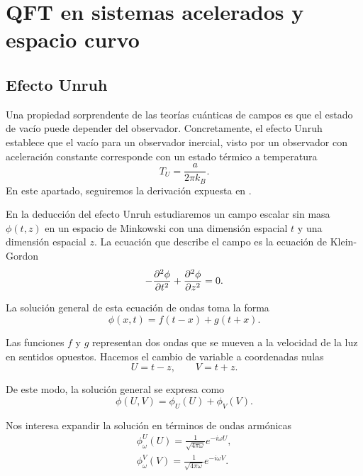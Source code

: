 \chapter{QFT en sistemas acelerados y espacio curvo}

\section{Efecto Unruh}

Una propiedad sorprendente de las teorías cuánticas de campos es que el estado de vacío
puede depender del observador.
Concretamente, el efecto Unruh establece que el vacío para un observador inercial,
visto por un observador con aceleración constante corresponde con un estado térmico a temperatura
\begin{equation}
  T_U=\frac{a}{2\pi k_B}.
\end{equation}
En este apartado, seguiremos la derivación expuesta en \cite{Barbado:2015uua}.

En la deducción del efecto Unruh estudiaremos un campo escalar sin masa $\phi(t,z)$ en un espacio de Minkowski
con una dimensión espacial $t$ y una dimensión espacial $z$.  
La ecuación que describe el campo es la ecuación de Klein-Gordon
\begin{equation}
  -\pdv[2]{\phi}{t}+\pdv[2]{\phi}{z}=0.
\end{equation}

La solución general de esta ecuación de ondas toma la forma
\begin{equation}
  \phi(x,t)=f(t-x)+g(t+x).
\end{equation}

Las funciones $f$ y $g$ representan dos ondas que se mueven a la velocidad de la luz en sentidos
opuestos. 
Hacemos el cambio de variable a coordenadas nulas
\begin{equation}
  U=t-z,   \qquad V=t+z.
\end{equation}

De este modo, la solución general se expresa como
\begin{equation}
  \phi(U,V)=\phi_U(U)+\phi_V(V).
\end{equation}

Nos interesa expandir la solución en términos de ondas armónicas
\begin{gather}
  \phi_\omega^U(U)=\frac{1}{\sqrt{4\pi\omega}} e^{-i\omega U},  \\
  \phi_\omega^V(V)=\frac{1}{\sqrt{4\pi\omega}} e^{-i\omega V}.
\end{gather}

